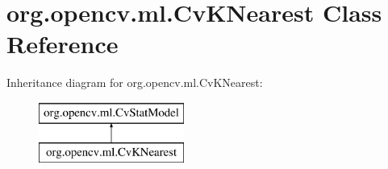 \hypertarget{classorg_1_1opencv_1_1ml_1_1_cv_k_nearest}{}\section{org.\+opencv.\+ml.\+Cv\+K\+Nearest Class Reference}
\label{classorg_1_1opencv_1_1ml_1_1_cv_k_nearest}
Inheritance diagram for org.\+opencv.\+ml.\+Cv\+K\+Nearest\+:\begin{figure}[H]
\begin{center}
\leavevmode
\includegraphics[height=2.000000cm]{classorg_1_1opencv_1_1ml_1_1_cv_k_nearest}
\end{center}
\end{figure}
